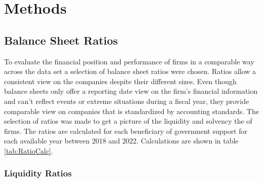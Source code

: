 
\chapter{Methods} %

\label{Chapter4} %


\section{Balance Sheet Ratios}
\label{section:BSratios}

To evaluate the financial position and performance of firms in a comparable way across the data set a selection of balance sheet ratios were chosen. Ratios allow a consistent view on the companies despite their different sizes. Even though balance sheets only offer a reporting date view on the firm’s financial information and can’t reflect events or extreme situations during a fiscal year, they provide comparable view on companies that is standardized by accounting standards.  The selection of ratios was made to get a picture of the liquidity and solvency the of firms. The ratios are calculated for each beneficiary of government support for each available year between 2018 and 2022. Calculations are shown in table \ref{tab:RatioCalc}.

\subsection{Liquidity Ratios}

